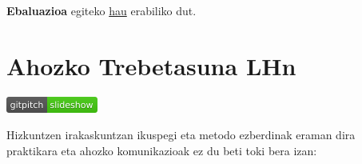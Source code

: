 \documentclass[
]{book}
\begin{document}
\textbf{Ebaluazioa} egiteko \href{http://evirtual.uaslp.mx/FCQ/estrategias/Material\%20de\%20Apoyo/cat_rubrica.pdf}{hau} erabiliko dut.

\hypertarget{ahozko-trebetasuna-lhn}{%
\chapter{Ahozko Trebetasuna LHn}\label{ahozko-trebetasuna-lhn}}

\href{../Diapoak/03_Diap-ahozko_trebetasunak.html}{\includegraphics{assets/badge.png}}

Hizkuntzen irakaskuntzan ikuspegi eta metodo ezberdinak eraman dira
praktikara eta ahozko komunikazioak ez du beti toki bera izan:
\end{document}
